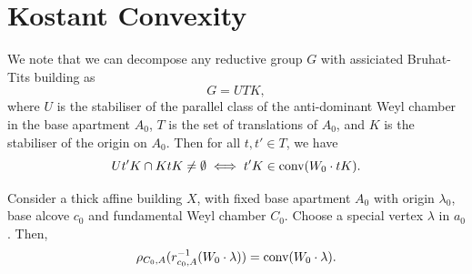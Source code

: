 \documentclass[11pt]{article}
\begin{document}
\section{Kostant Convexity}

\begin{theorem}
    We note that we can decompose any reductive group $G$ with assiciated Bruhat-Tits building as
    \[G=UTK,\]
    where $U$ is the stabiliser of the parallel class of the anti-dominant Weyl chamber in the base apartment $A_0$, $T$ is the set of translations of $A_0$, and $K$ is the stabiliser of the origin on $A_0$. 
    Then for all $t,t'\in T$, we have
    \[Ut'K\cap KtK\neq \emptyset \iff t'K\in\textnormal{conv}(W_0\cdot tK).\]
\end{theorem}


\begin{theorem}
    Consider a thick affine building $X$, with fixed base apartment $A_0$ with origin $\lambda_0$, base alcove $c_0$ and fundamental Weyl chamber $C_0$. Choose a special vertex $\lambda$ in $a_0$. Then,
    \[\rho_{C_0,A}(r^{-1}_{c_0,A}(W_0\cdot\lambda))=\textnormal{conv}(W_0\cdot \lambda).\]
\end{theorem}
\end{document}
